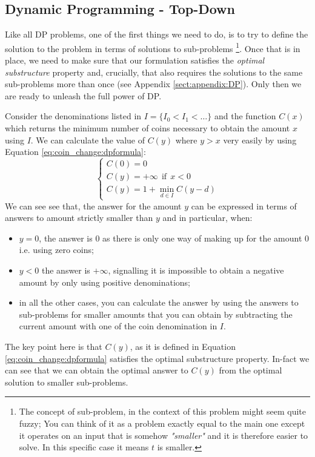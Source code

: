 \subsection{Dynamic Programming - Top-Down}
\label{sec:coin_change:topdown}
Like all DP problems, one of the first things we need to do, is to try to define the solution to the problem in terms of solutions to sub-problems
\footnote{The concept of sub-problem, in the context of this problem might seem quite fuzzy; You can think of it as a problem exactly equal to the main one except it operates on an input that
is  somehow \textit{"smaller"} and it is therefore easier to solve.
In this specific case it means $t$  is smaller.}.
Once that is in place, we need to make sure that our formulation satisfies the \textit{optimal substructure} property and, crucially, that also requires the solutions to the same sub-problems
more than once (see Appendix \ref{sect:appendix:DP}). 
Only then we are ready to unleash the full power of DP.

Consider the denominations listed in $I=\{I_0 < I_1 < \ldots \}$ and the function $C(x)$ which returns the minimum number of coins necessary to obtain the amount $x$ using $I$. 
We can calculate the value of $C(y)$ where $y > x$ very easily by using Equation \ref{eq:coin_change:dpformula}:
\begin{equation}
	\begin{cases}
		C(0) = 0 \\
		C(y) = +\infty \: \: \text{if} \: \: x < 0 \\
 		C(y) = 1 + \min_{d \in I} C(y-d)
	 \end{cases}
	\label{eq:coin_change:dpformula}
\end{equation}
We can see see that, the answer for the amount $y$ can be expressed in terms of answers to amount strictly smaller than $y$ and in particular, when:
\begin{itemize}
	\item $y=0$, the answer is $0$ as there is only one way of making up for the amount $0$ i.e. using zero coins;
	\item $y<0$ the answer is $+\infty$, signalling it is impossible to obtain a negative amount by only using positive denominations;
	\item in all the other cases, you can calculate the answer by using the answers to sub-problems for smaller amounts that you can obtain by subtracting the current amount with one of the coin denomination in $I$.
\end{itemize} 
The key point here is that $C(y)$, as it is defined in Equation \ref{eq:coin_change:dpformula} satisfies the optimal substructure property.
In-fact we can see that we can obtain the optimal answer to $C(y)$ from the optimal solution to smaller sub-problems. 


